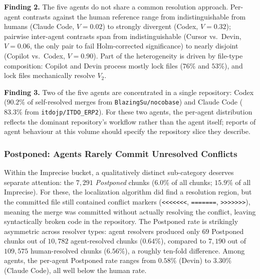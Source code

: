 \documentclass[sigconf,anonymous]{acmart}
\begin{document}
\begin{findingbox}
\textbf{Finding 2.} The five agents do not share a common resolution approach. Per-agent contrasts against the human reference range from indistinguishable from humans (Claude Code, $V{=}0.02$) to strongly divergent (Codex, $V{=}0.32$); pairwise inter-agent contrasts span from indistinguishable (Cursor vs.\ Devin, $V{=}0.06$, the only pair to fail Holm-corrected significance) to nearly disjoint (Copilot vs.\ Codex, $V{=}0.90$). Part of the heterogeneity is driven by file-type composition: Copilot and Devin process mostly lock files ($76\%$ and $53\%$), and lock files mechanically resolve $V_2$. 
\end{findingbox}

\begin{findingbox}
\textbf{Finding 3.} Two of the five agents are concentrated in a single repository: Codex ($90.2\%$ of self-resolved merges from \linebreak \texttt{BlazingSu/nocobase}) and Claude Code ($83.3\%$ from \linebreak \texttt{itdojp/ITDO\_ERP2}). For these two agents, the per-agent distribution reflects the dominant repository's workflow rather than the agent itself; reports of agent behaviour at this volume should specify the repository slice they describe.
\end{findingbox}

\subsubsection{Postponed: Agents Rarely Commit Unresolved Conflicts}
\label{sec:rq2-postponed}

Wi\-thin the Imprecise bucket, a qualitatively distinct sub-category deserves separate attention: the $7{,}291$ \emph{Postponed} chunks ($6.0\%$ of all chunks; $15.9\%$ of all Imprecise). For these, the localization algorithm did find a resolution region, but the committed file still contained conflict markers (\verb|<<<<<<<|, \verb|=======|, \verb|>>>>>>>|), meaning the merge was committed without actually resolving the conflict, leaving syntactically broken code in the repository. The Postponed rate is strikingly asymmetric across resolver types: agent resolvers produced only $69$ Postponed chunks out of $10{,}782$ agent-resolved chunks ($0.64\%$), compared to $7{,}190$ out of $109{,}575$ human-resolved chunks ($6.56\%$), a roughly ten-fold difference. Among agents, the per-agent Postponed rate ranges from $0.58\%$ (Devin) to $3.30\%$ (Claude Code), all well below the human rate.
\end{document}
